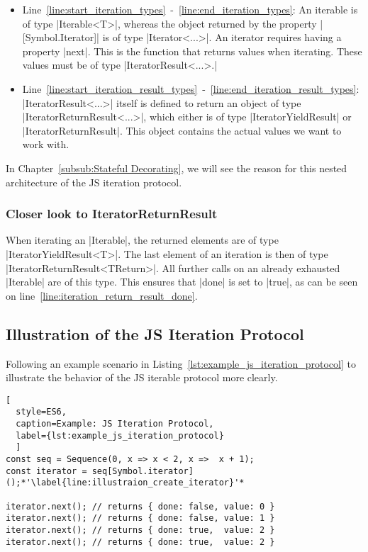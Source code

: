 \begin{itemize}
  \item{Line~\ref{line:start_iteration_types}~-~\ref{line:end_iteration_types}: 
      An iterable is of type |Iterable<T>|, whereas the object returned by the property
      |[Symbol.Iterator]| is of type |Iterator<...>|. An iterator requires having a property |next|. 
      This is the function that returns values when iterating. These values must be 
      of type |IteratorResult<...>.|
    }
  \item{Line~\ref{line:start_iteration_result_types}~-~\ref{line:end_iteration_result_types}:
      |IteratorResult<...>| itself is defined to return an 
      object of type |IteratorReturnResult<...>|, which either is of type
      |IteratorYieldResult| or |IteratorReturnResult|. This object contains the actual 
      values we want to work with.}
\end{itemize}

In Chapter~\ref{subsub:Stateful Decorating}, we will see the reason for this
nested architecture of the JS iteration protocol.

\subsubsection{Closer look to IteratorReturnResult}
\label{subsub:Closer look to IteratorReturnResult}
When iterating an |Iterable|, the returned elements are of type
|IteratorYieldResult<T>|. The last element of an iteration is then of type
|IteratorReturnResult<TReturn>|. All further calls on an already exhausted
|Iterable| are of this type. This ensures that |done| is set to |true|, as 
can be seen on line~\ref{line:iteration_return_result_done}.


\subsection{Illustration of the JS Iteration Protocol}
\label{sub:Illustration of the JS Iteration Protocol}
Following an example scenario in Listing~\ref{lst:example_js_iteration_protocol}
to illustrate the behavior of the JS iterable protocol more clearly.

\begin{lstlisting}[
  style=ES6, 
  caption=Example: JS Iteration Protocol,
  label={lst:example_js_iteration_protocol}
  ]
const seq = Sequence(0, x => x < 2, x =>  x + 1); 
const iterator = seq[Symbol.iterator]();*'\label{line:illustraion_create_iterator}'*

iterator.next(); // returns { done: false, value: 0 }
iterator.next(); // returns { done: false, value: 1 }
iterator.next(); // returns { done: true,  value: 2 }
iterator.next(); // returns { done: true,  value: 2 }
\end{lstlisting}

